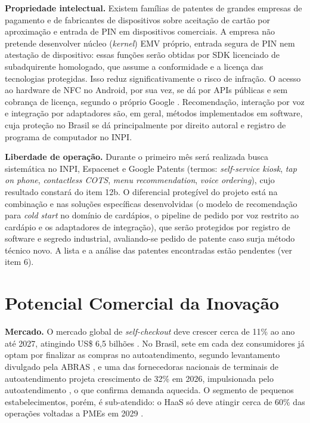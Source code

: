 \documentclass[12pt,a4paper]{article}
\begin{document}
\textbf{Propriedade intelectual.} Existem famílias de patentes de grandes empresas de pagamento e de fabricantes de dispositivos sobre aceitação de cartão por aproximação e entrada de PIN em dispositivos comerciais. A empresa não pretende desenvolver núcleo (\textit{kernel}) EMV próprio, entrada segura de PIN nem atestação de dispositivo: essas funções serão obtidas por SDK licenciado de subadquirente homologado, que assume a conformidade e a licença das tecnologias protegidas. Isso reduz significativamente o risco de infração. O acesso ao hardware de NFC no Android, por sua vez, se dá por APIs públicas e sem cobrança de licença, segundo o próprio Google \cite{folha_cade}. Recomendação, interação por voz e integração por adaptadores são, em geral, métodos implementados em software, cuja proteção no Brasil se dá principalmente por direito autoral e registro de programa de computador no INPI.

\textbf{Liberdade de operação.} Durante o primeiro mês será realizada busca sistemática no INPI, Espacenet e Google Patents (termos: \textit{self-service kiosk}, \textit{tap on phone}, \textit{contactless COTS}, \textit{menu recommendation}, \textit{voice ordering}), cujo resultado constará do item 12b. O diferencial protegível do projeto está na combinação e nas soluções específicas desenvolvidas (o modelo de recomendação para \textit{cold start} no domínio de cardápios, o pipeline de pedido por voz restrito ao cardápio e os adaptadores de integração), que serão protegidos por registro de software e segredo industrial, avaliando-se pedido de patente caso surja método técnico novo. A lista e a análise das patentes encontradas estão pendentes (ver item 6).

\section{Potencial Comercial da Inovação}

\textbf{Mercado.} O mercado global de \textit{self-checkout} deve crescer cerca de 11\% ao ano até 2027, atingindo US\$ 6,5 bilhões \cite{pegn2026}. No Brasil, sete em cada dez consumidores já optam por finalizar as compras no autoatendimento, segundo levantamento divulgado pela ABRAS \cite{abras2024}, e uma das fornecedoras nacionais de terminais de autoatendimento projeta crescimento de 32\% em 2026, impulsionada pelo autoatendimento \cite{pegn2026}, o que confirma demanda aquecida. O segmento de pequenos estabelecimentos, porém, é sub-atendido: o HaaS só deve atingir cerca de 60\% das operações voltadas a PMEs em 2029 \cite{pegn2026, genialtec2026}.
\end{document}
